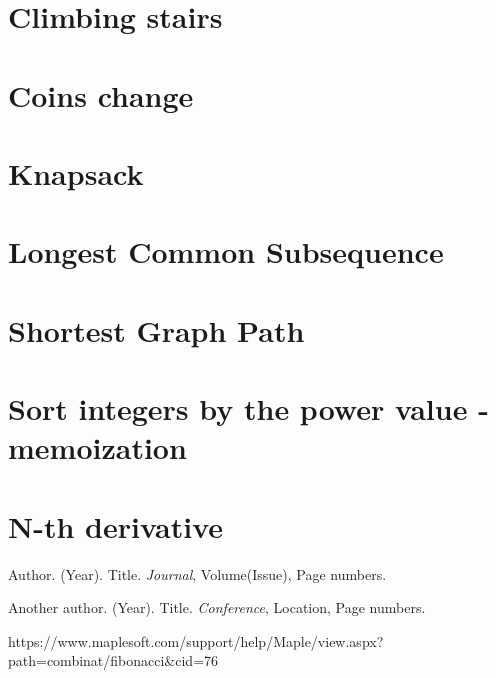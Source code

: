 \documentclass{article}
\begin{document}
\section{Climbing stairs}

\section{Coins change}

\section{Knapsack}

\section{Longest Common Subsequence}

\section{Shortest Graph Path}

\section{Sort integers by the power value - memoization}

\section{N-th derivative}

\begin{thebibliography}{9}
Author. (Year). Title. \textit{Journal}, Volume(Issue), Page numbers.

Another author. (Year). Title. \textit{Conference}, Location, Page numbers.

https://www.maplesoft.com/support/help/Maple/view.aspx?path=combinat/fibonacci\&cid=76

\end{thebibliography}
\end{document}
